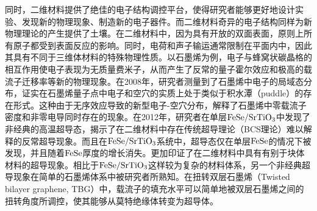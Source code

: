     同时，二维材料提供了绝佳的电子结构调控平台，使得研究者能够更好地设计实验、发现新的物理现象、制造新的电子器件。而二维材料奇异的电子结构同样为新物理理论的产生提供了土壤。在二维材料中，因为具有开放的双面表面，原则上所有原子都受到表面反应的影响。同时，电荷和声子输运通常限制在平面内中，因此其具有不同于三维体材料的特殊物理性质。以石墨烯为例，电子与蜂窝状碳晶格的相互作用使电子表现为无质量费米子，从而产生了反常的量子霍尔效应和极高的载流子迁移率等新的物理现象。在2008年，研究者测量到了石墨烯中电子的局域态分布，证实在石墨烯量子点中电子和空穴的实质上处于类似于积水潭（puddle）的存在形式。这种由于无序效应导致的新型电子-空穴分布，解释了石墨烯中零载流子密度和非零电导同时存在的现象。在2012年，研究者在单层$\rm{FeSe/SrTiO_{3}}$中发现了非经典的高温超导态，揭示了在二维材料中存在传统超导理论（BCS理论）难以解释的反常超导现象。而且在$\rm{FeSe/SrTiO_{3}}$系统中，超导态仅在单层$\rm{FeSe}$的情况下被发现，并且随着$\rm{FeSe}$厚度的增长消失。更加印证了在二维材料中具有有别于块体材料的超导现象。相比于$\rm{FeSe/SrTiO_{3}}$这样较为复杂的材料体系，另一个非经典超导现象在简单的石墨烯体系中被研究者所熟知。在扭转双层石墨烯（Twisted bilayer graphene, TBG）中，载流子的填充水平可以简单地被双层石墨烯之间的扭转角度所调控，使其能够从莫特绝缘体转变为超导体。

